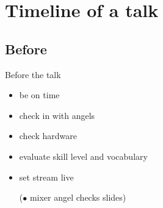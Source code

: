 \documentclass[hyperref={pdfpagelabels=false},aspectratio=169]{beamer}
\begin{document}
\section{Timeline of a talk}  %
\subsection{Before}
\begin{frame}{Before the talk}
\begin{itemize} %
\item be on time %
\item check in with angels %
\item check hardware %
\item evaluate skill level and vocabulary %
\item set stream live %
\item [($\bullet$] mixer angel checks slides) %
\end{itemize} 
\end{frame}
\end{document}
